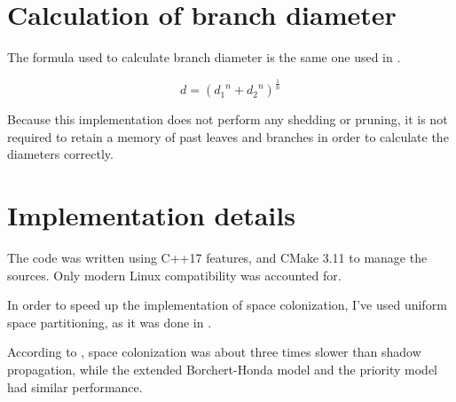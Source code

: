 \documentclass{article}
\begin{document}
\section{Calculation of branch diameter}

The formula used to calculate branch diameter is the same one used in \cite{Palubicki2009}.

\[d = \left({d_1}^n + {d_2}^n\right)^{\frac{1}{n}}\]

Because this implementation does not perform any shedding or pruning, it is not required to retain a memory of past leaves and branches in order to calculate the diameters correctly.

\section{Implementation details}

The code was written using C++17 features, and CMake 3.11 to manage the sources. Only modern Linux compatibility was accounted for.

In order to speed up the implementation of space colonization, I've used uniform space partitioning, as it was done in \cite{Palubicki2009}.

According to \cite{Palubicki2009}, space colonization was about three times slower than shadow propagation, while the extended Borchert-Honda model and the priority model had similar performance.

\printbibliography
\end{document}
